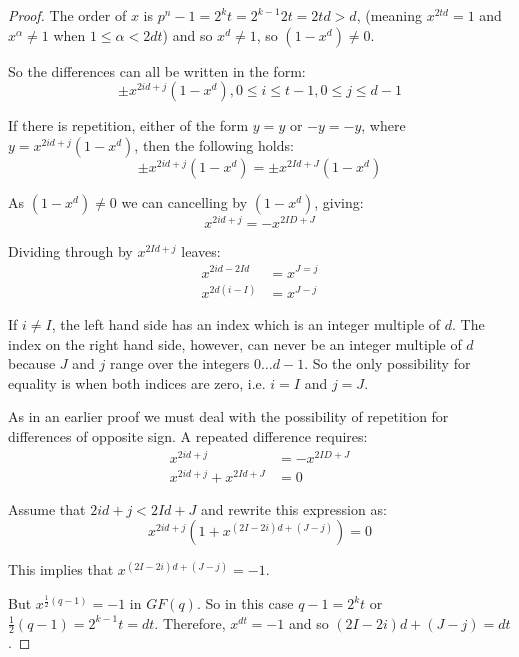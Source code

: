 \begin{proof}
The order of $x$ is $p^{n}-1 = 2^{k}t = 2^{k - 1}2t = 2td > d$, (meaning $x^{2td} = 1$ and $x^\alpha \neq 1$ when $1 \leq \alpha < 2dt$) and so $x^d \neq 1$, so $(1 - x^d) \neq 0$.

So the differences can all be written in the form:
\begin{equation*}
\pm x^{2id + j}(1 - x^d), 0 \leq i \leq t-1, 0 \leq j \leq d-1
\end{equation*}

If there is repetition, either of the form $y = y$ or $-y = -y$, where $y = x^{2id + j}(1 - x^d)$, then the following holds:
\begin{equation*}
\pm x^{2id + j}(1 - x^d) = \pm x^{2Id + J}(1 - x^d)
\end{equation*}

As $(1 - x^d) \neq 0$ we can cancelling by $(1 - x^d)$, giving:
\begin{equation}
x^{2id + j} = -x^{2ID + J}
\end{equation}

Dividing through by $x^{2Id + j}$ leaves:
\begin{align*}
  x^{2id - 2Id} &= x^{J = j} \\
  x^{2d(i - I)} &= x^{J - j}
\end{align*}

If $i \neq I$, the left hand side has an index which is an integer multiple of $d$.
The index on the right hand side, however, can never be an integer multiple of $d$ because $J$ and $j$ range over the integers $0 \ldots d - 1$.
So the only possibility for equality is when both indices are zero, i.e. $i = I$ and $j = J$.

As in an earlier proof we must deal with the possibility of repetition for differences of opposite sign.
A repeated difference requires:
\begin{align*}
  x^{2id + j} &= -x^{2ID + J} \\
  x^{2id + j} + x^{2Id + J} &= 0
\end{align*}

Assume that $2id + j < 2Id + J$ and rewrite this expression as:
\begin{equation*}
x^{2id + j}(1 + x^{(2I - 2i)d + (J - j)}) = 0
\end{equation*}

This implies that $x^{(2I - 2i)d + (J - j)} = -1$.

But $x^{\frac{1}{2}(q - 1)} = -1$ in $GF(q)$.
So in this case $q - 1 = 2^kt$ or $\frac{1}{2}(q - 1) = 2^{k - 1}t = dt$.
Therefore, $x^{dt} = -1$ and so $(2I - 2i)d + (J - j) = dt$.


\end{proof}
